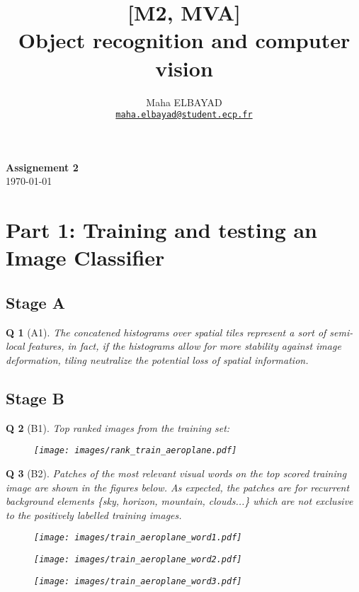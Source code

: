 \documentclass[11pt]{article}
\title{[M2, MVA]\\ Object recognition and computer vision}
\author{Maha ELBAYAD\\ \href{mailto:maha.elbayad@student.ecp.fr}{\tt maha.elbayad@student.ecp.fr}}
\date{}
\theoremstyle{exo}
\newtheorem*{exercise}{Q}
\newcommand{\1}{\mathbf{1}}
\newcommand{\0}{\mathbf{0}}
\begin{document}
\maketitle
\vspace{-10pt}
\begin{center}
{\huge \bf Assignement 2}\\
\today
\vspace{10pt}
\end{center}

\vspace{7pt}

\section*{Part 1: Training and testing an Image Classifier}
\subsection*{Stage A}
\begin{exercise}[A1]
	The concatened histograms over spatial tiles represent a sort of semi-local features, in fact, if the histograms allow for more stability against image deformation, tiling neutralize the potential loss of spatial information.
\end{exercise}

\subsection*{Stage B}
\begin{exercise}[B1]
	Top ranked images from the training set:
	\begin{figure}[H]
	\centering
	\texttt{[image: images/rank\_train\_aeroplane.pdf]}
	\end{figure}
\end{exercise}

\begin{exercise}[B2]
	Patches of the most relevant visual words on the top scored training image are shown in the figures below. As expected, the patches are for recurrent background elements \{sky, horizon, mountain, clouds...\} which are not exclusive to the positively labelled training images.
	\begin{figure}[H]
	\centering
	\texttt{[image: images/train\_aeroplane\_word1.pdf]}
	\end{figure}
	\begin{figure}[H]
	\centering
	\texttt{[image: images/train\_aeroplane\_word2.pdf]}
	\end{figure}
	\begin{figure}[H]
	\centering
	\texttt{[image: images/train\_aeroplane\_word3.pdf]}
	\end{figure}
\end{exercise}
\end{document}
